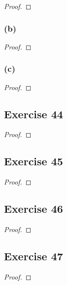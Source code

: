 \documentclass[14pt]{extarticle}
\begin{document}
\begin{proof}

\end{proof}

\subsubsection{(b)}

\begin{proof}

\end{proof}

\subsubsection{(c)}

\begin{proof}

\end{proof}

\subsection{Exercise 44}

\begin{proof}

\end{proof}

\subsection{Exercise 45}

\begin{proof}

\end{proof}

\subsection{Exercise 46}

\begin{proof}

\end{proof}

\subsection{Exercise 47}

\begin{proof}

\end{proof}
\end{document}
